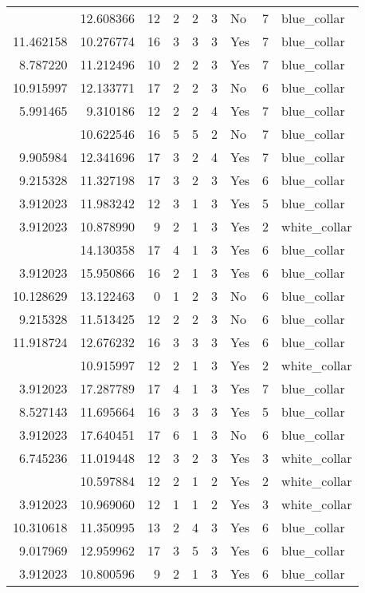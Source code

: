 \documentclass[
]{article}
\begin{document}
\begin{longtable}[t]{rrrrrllrl}
\addlinespace
9.800901 & 12.608366 & 12 & 2 & 2 & 3 & No & 7 & blue\_collar\\
11.462158 & 10.276774 & 16 & 3 & 3 & 3 & Yes & 7 & blue\_collar\\
8.787220 & 11.212496 & 10 & 2 & 2 & 3 & Yes & 7 & blue\_collar\\
10.915997 & 12.133771 & 17 & 2 & 2 & 3 & No & 6 & blue\_collar\\
5.991465 & 9.310186 & 12 & 2 & 2 & 4 & Yes & 7 & blue\_collar\\
\addlinespace
5.010635 & 10.622546 & 16 & 5 & 5 & 2 & No & 7 & blue\_collar\\
9.905984 & 12.341696 & 17 & 3 & 2 & 4 & Yes & 7 & blue\_collar\\
9.215328 & 11.327198 & 17 & 3 & 2 & 3 & Yes & 6 & blue\_collar\\
3.912023 & 11.983242 & 12 & 3 & 1 & 3 & Yes & 5 & blue\_collar\\
3.912023 & 10.878990 & 9 & 2 & 1 & 3 & Yes & 2 & white\_collar\\
\addlinespace
3.912023 & 14.130358 & 17 & 4 & 1 & 3 & Yes & 6 & blue\_collar\\
3.912023 & 15.950866 & 16 & 2 & 1 & 3 & Yes & 6 & blue\_collar\\
10.128629 & 13.122463 & 0 & 1 & 2 & 3 & No & 6 & blue\_collar\\
9.215328 & 11.513425 & 12 & 2 & 2 & 3 & No & 6 & blue\_collar\\
11.918724 & 12.676232 & 16 & 3 & 3 & 3 & Yes & 6 & blue\_collar\\
\addlinespace
3.912023 & 10.915997 & 12 & 2 & 1 & 3 & Yes & 2 & white\_collar\\
3.912023 & 17.287789 & 17 & 4 & 1 & 3 & Yes & 7 & blue\_collar\\
8.527143 & 11.695664 & 16 & 3 & 3 & 3 & Yes & 5 & blue\_collar\\
3.912023 & 17.640451 & 17 & 6 & 1 & 3 & No & 6 & blue\_collar\\
6.745236 & 11.019448 & 12 & 3 & 2 & 3 & Yes & 3 & white\_collar\\
\addlinespace
3.912023 & 10.597884 & 12 & 2 & 1 & 2 & Yes & 2 & white\_collar\\
3.912023 & 10.969060 & 12 & 1 & 1 & 2 & Yes & 3 & white\_collar\\
10.310618 & 11.350995 & 13 & 2 & 4 & 3 & Yes & 6 & blue\_collar\\
9.017969 & 12.959962 & 17 & 3 & 5 & 3 & Yes & 6 & blue\_collar\\
3.912023 & 10.800596 & 9 & 2 & 1 & 3 & Yes & 6 & blue\_collar\\

\end{longtable}
\end{document}
